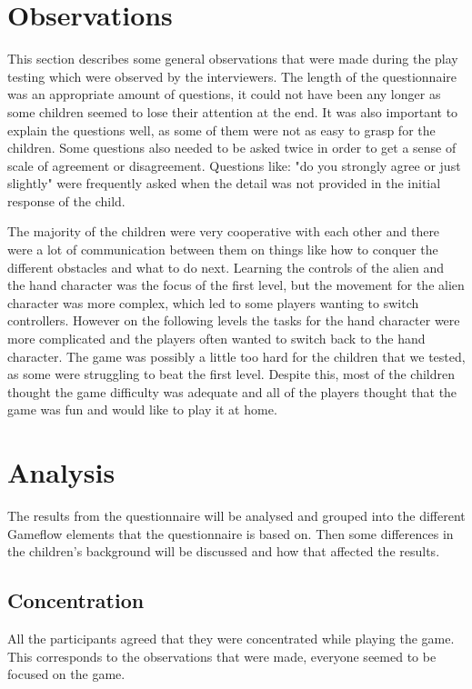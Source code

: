 \section{Observations}
This section describes some general observations that were made during the play testing which were observed by the interviewers. The length of the questionnaire was an appropriate amount of questions, it could not have been any longer as some children seemed to lose their attention at the end. It was also important to explain the questions well, as some of them were not as easy to grasp for the children. Some questions also needed to be asked twice in order to get a sense of scale of agreement or disagreement. Questions like: "do you strongly agree or just slightly" were frequently asked when the detail was not provided in the initial response of the child. 

The majority of the children were very cooperative with each other and there were a lot of communication between them on things like how to conquer the different obstacles and what to do next. Learning the controls of the alien and the hand character was the focus of the first level, but the movement for the alien character was more complex, which led to some players wanting to switch controllers. However on the following levels the tasks for the hand character were more complicated and the players often wanted to switch back to the hand character. The game was possibly a little too hard for the children that we tested, as some were struggling to beat the first level.  Despite this, most of the children thought the game difficulty was adequate and all of the players thought that the game was fun and would like to play it at home.


\section{Analysis }
The results from the questionnaire will be analysed and grouped into the different Gameflow elements that the questionnaire is based on. Then some differences in the children's background will be discussed and how that affected the results.

\subsection{Concentration}
All the participants agreed that they were concentrated while playing the game. This corresponds to the observations that were made, everyone seemed to be focused on the game.

